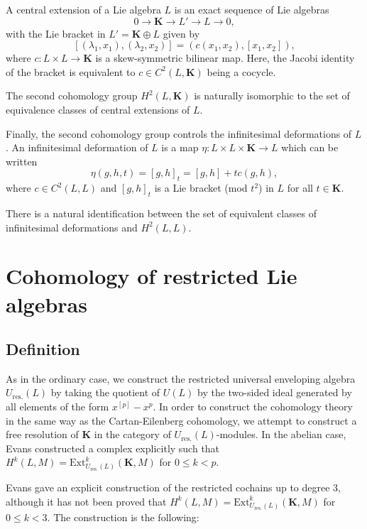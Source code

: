 \documentclass[11pt, twoside]{article}
\begin{document}
A central extension of a Lie algebra $L$ is an exact sequence of Lie algebras $$0\to \mathbf{K}\to L'\to L\to 0 ,$$ with the Lie bracket in $L'=\mathbf{K}\oplus L$ given by $$[(\lambda_1,x_1),(\lambda_2,x_2)]= (c(x_1,x_2),[x_1,x_2]) ,$$ where $c:L\times L\to \mathbf{K}$ is a skew-symmetric bilinear map. Here, the Jacobi identity of the bracket is equivalent to $c\in C^2(L,\mathbf{K})$ being a cocycle. 

\begin{prop}
    The second cohomology group $H^2(L,\mathbf{K})$ is naturally isomorphic to the set of equivalence classes of central extensions of $L$.
\end{prop}


Finally, the second cohomology group controls the infinitesimal deformations of $L$. An infinitesimal deformation of $L$ is a map $\eta:L\times L\times \mathbf{K}\to L $ which can be written  $$\eta(g,h,t)= [g,h]_t =[g,h]+tc(g,h) ,$$ where $c\in C^2(L,L)$ and $[g,h]_t$ is a Lie bracket (mod $t^2$) in $L$ for all $t\in \mathbf{K}$. 

\begin{prop}
    There is a natural identification between the set of equivalent classes of infinitesimal deformations and $H^2(L,L)$.
\end{prop}

\section{Cohomology of restricted Lie algebras}\label{s3}

\subsection{Definition}

 As in the ordinary case, we construct the restricted universal enveloping algebra $U_{\mathrm{res.}}(L) $ by taking the quotient of $U(L)$ by the two-sided ideal generated by all elements of the form $x^{[p]}-x^p $. In order to construct the cohomology theory in the same way as the Cartan-Eilenberg cohomology, we attempt to construct a free resolution of $\mathbf{K}$ in the category of $U_{\mathrm{res.}}(L) $-modules. In the abelian case, Evans constructed a complex explicitly such that $H^k(L,M)= \mathrm{Ext}_{U_{\mathrm{res.}}(L)}^k(\mathbf{K},M) $ for $0\leq k<p$. 

Evans gave an explicit construction of the restricted cochains up to degree $3$, although it has not been proved that $H^k(L,M)= \mathrm{Ext}_{U_{\mathrm{res.}}(L)}^k(\mathbf{K},M) $  for $0\leq k<3  $. The construction is the following: 
\end{document}
